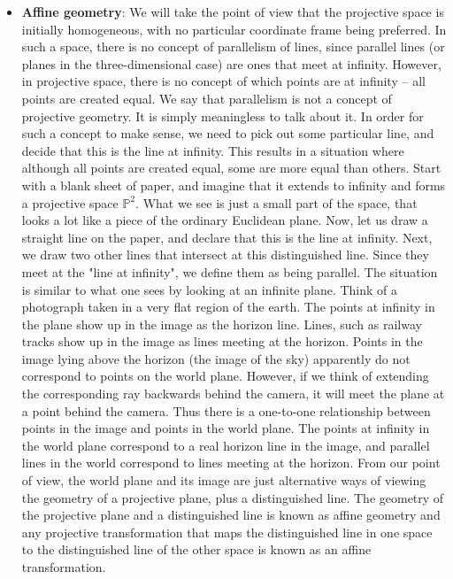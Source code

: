 \documentclass{report}
\begin{document}
\begin{itemize}
        \item \textbf{Affine geometry}: We will take the point of view that the projective space is initially homogeneous, with no particular coordinate frame being preferred. 
            \bigbreak \noindent 
            In such a space, there is no concept of parallelism of lines, since parallel lines (or planes in the three-dimensional case) are ones that meet at infinity. However, in projective space, there is no concept of which points are at infinity – all points are created equal. We say that parallelism is not a concept of projective geometry. It is simply meaningless to talk about it.
            \bigbreak \noindent 
            In order for such a concept to make sense, we need to pick out some particular line, and decide that this is the line at infinity. This results in a situation where although all points are created equal, some are more equal than others.
            \bigbreak \noindent 
            Start with a blank sheet of paper, and imagine that it extends to infinity and forms a projective space $\mathbb{P}^{2}$.
            \bigbreak \noindent 
            What we see is just a small part of the space, that looks a lot like a piece of the ordinary Euclidean plane. Now, let us draw a straight line on the paper, and declare that this is the line at infinity. Next, we draw two other lines that intersect at this distinguished line. Since they meet at the "line at infinity", we define them as being parallel. The situation is similar to what one sees by looking at an infinite plane.
            \bigbreak \noindent 
            Think of a photograph taken in a very flat region of the earth. The points at infinity in the plane show up in the image as the horizon line. Lines, such as railway tracks show up in the image as lines meeting at the horizon. Points in the image lying above the horizon (the image of the sky) apparently do not correspond to points on the world plane. However, if we think of extending the corresponding ray backwards behind the camera, it will meet the plane at a point behind the camera. Thus there is a one-to-one relationship between points in the image and points in the world plane.
            \bigbreak \noindent 
            The points at infinity in the world plane correspond to a real horizon line in the image, and parallel lines in the world correspond to lines meeting at the horizon. From our point of view, the world plane and its image are just alternative ways of viewing the geometry of a projective plane, plus a distinguished line. The geometry of the projective plane and a distinguished line is known as affine geometry and any projective transformation that maps the distinguished line in one space to the distinguished line of the other space is known as an affine transformation.

\end{itemize}
\end{document}
